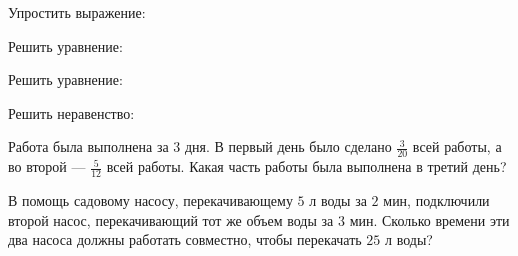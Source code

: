 \begin{listofex}
	\item {}
	\item Упростить выражение:
	\begin{enumcols}[itemcolumns=2]
		\item {}
		\item {}
	\end{enumcols}
	\item {}
	\item Решить уравнение:
	\begin{enumcols}[itemcolumns=2]
		\item {}
		\item {}
	\end{enumcols}
	\item Решить уравнение:
	\begin{enumcols}[itemcolumns=2]
		\item {}
		\item {}
		\item {}
		\item {}
	\end{enumcols}
	\item {}
	\item Решить неравенство:
	\begin{enumcols}[itemcolumns=3]
		\item {}
		\item {}
		\item {}
	\end{enumcols}
	\item Работа была выполнена за \( 3 \) дня. В первый день было сделано \( \frac{3}{20} \) всей работы, а во второй --- \( \frac{5}{12} \) всей работы. Какая часть работы была выполнена в третий день?
	\item В помощь садовому насосу, перекачивающему \( 5 \) л воды за \( 2 \) мин, подключили второй насос, перекачивающий тот же объем воды за \( 3 \) мин. Сколько времени эти два насоса должны работать совместно, чтобы перекачать \( 25 \) л воды?
\end{listofex}
